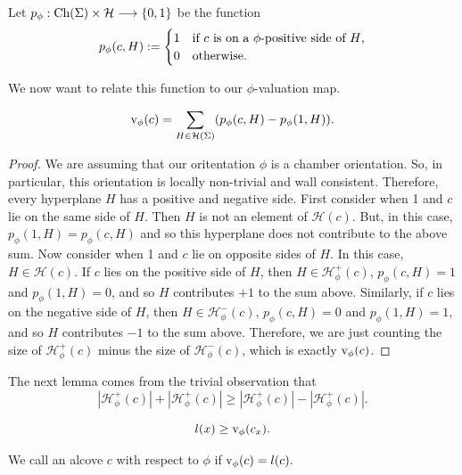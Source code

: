 \documentclass[11pt]{article}
\begin{document}
\begin{definition}
    Let $p_\phi : \textnormal{Ch}(\Sigma)\times \mathcal{H}\longrightarrow \{0,1\}$ be the function 
    \[p_\phi(c,H):= \begin{cases}
        1 & \textnormal{if $c$ is on a $\phi$-positive side of $H$,}\\
        0 & \textnormal{otherwise.}
    \end{cases}\]
\end{definition}

We now want to relate this function to our $\phi$-valuation map.

\begin{lemma}
    \[\textnormal{v}_\phi(c)=\sum_{H\in\mathcal{H}(\Sigma)}(p_{\phi}(c,H)-p_\phi(1,H)).\]
\end{lemma}

\begin{proof}
    We are assuming that our oritentation $\phi$ is a chamber orientation. So, in particular, this orientation is locally non-trivial and wall consistent. Therefore, every hyperplane $H$ has a positive and negative side. First consider when 1 and $c$ lie on the same side of $H$. Then $H$ is not an element of $\mathcal{H}(c)$. But, in this case, $p_\phi(1,H)=p_\phi(c,H)$ and so this hyperplane does not contribute to the above sum. 
    Now consider when 1 and $c$ lie on opposite sides of $H$. In this case, $H\in \mathcal{H}(c)$. If $c$ lies on the positive side of $H$, then $H\in\mathcal{H}_{\phi}^+(c)$, $p_\phi(c,H)=1$ and $p_\phi(1,H)=0$, and so $H$ contributes $+1$ to the sum above. Similarly, if $c$ lies on the negative side of $H$, then $H\in\mathcal{H}_{\phi}^-(c)$, $p_\phi(c,H)=0$ and $p_\phi(1,H)=1$, and so $H$ contributes $-1$ to the sum above. Therefore, we are just counting the size of $\mathcal{H}_{\phi}^+(c)$ minus the size of $\mathcal{H}_{\phi}^-(c)$, which is exactly $\textnormal{v}_\phi(c)$. 
\end{proof}


The next lemma comes from the trivial observation that \[|\mathcal{H}_{\phi}^+(c)|+|\mathcal{H}_{\phi}^+(c)|\geq |\mathcal{H}_{\phi}^+(c)|-|\mathcal{H}_{\phi}^+(c)|.\]
\begin{lemma}
    \[l(x)\geq\textnormal{v}_\phi(c_x).\]
\end{lemma}

\begin{definition}
    We call an alcove $c$  with respect to $\phi$ if $\textnormal{v}_\phi(c)=l(c).$
\end{definition}
\end{document}
